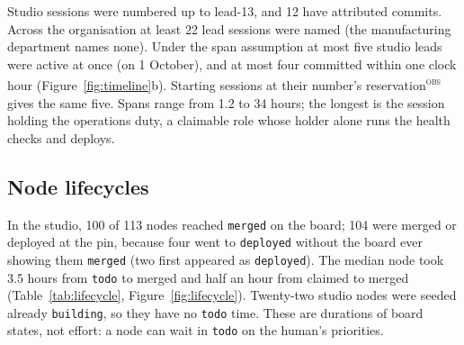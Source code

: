 \documentclass[11pt]{article}
\newcommand{\code}[1]{\texttt{#1}}
\newcommand{\obs}{\textsuperscript{\textsc{obs}}}
\begin{document}
Studio sessions were numbered up to lead-13, and 12 have attributed commits. Across the %
organisation at least 22 lead sessions were named (the manufacturing department names %
none). Under the span assumption at most five
studio leads were active at once (on 1 October), and at most four committed within one %
clock hour (Figure~\ref{fig:timeline}b). Starting sessions at their number's
reservation\obs{} gives the same five. Spans range from 1.2 to 34 hours; the longest is %
the session holding the operations duty, a claimable role whose holder alone runs the %
health checks and deploys.

\subsection{Node lifecycles}

In the studio, 100 of 113 nodes reached \code{merged} on the board; 104 were merged or %
deployed at the pin, because four went to \code{deployed} without the board ever showing
them \code{merged} (two first appeared as \code{deployed}). The median node took 3.5 hours %
from \code{todo} to merged and half an hour from claimed to merged
(Table~\ref{tab:lifecycle}, Figure~\ref{fig:lifecycle}). Twenty-two studio nodes were %
seeded already \code{building}, so they have no \code{todo} time. These are durations of
board states, not effort: a node can wait in \code{todo} on the human's priorities.
\end{document}
